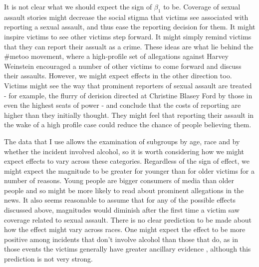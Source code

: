\documentclass[AER,draftmode]{AEA}
\begin{document}
It is not clear what we should expect the sign of $\beta_1$ to be. Coverage of sexual assault stories might decrease the social stigma that victims see associated with reporting a sexual assault, and thus ease the reporting decision for them. It might inspire victims to see other victims step forward. It might simply remind victims that they can report their assualt as a crime. These ideas are what lie behind the \#metoo movement, where a high-profile set of allegations against Harvey Weinstein encouraged a number of other victims to come forward and discuss their assaults. However, we might expect effects in the other direction too. Victims might see the way that prominent reporters of sexual assault are treated - for example, the flurry of derision directed at Christine Blasey Ford by those in even the highest seats of power - and conclude that the costs of reporting are higher than they initially thought. They might feel that reporting their assault in the wake of a high profile case could reduce the chance of people believing them. 

The data that I use allows the examination of subgroups by age, race and by whether the incident involved alcohol, so it is worth considering how we might expect effects to vary across these categories. Regardless of the sign of effect, we might expect the magnitude to be greater for younger than for older victims for a number of reasons. Young people are bigger consumers of media than older people  and so might be more likely to read about prominent allegations in the news. It also seems reasonable to assume that for any of the possible effects discussed above, magnitudes would diminish after the first time a victim saw coverage related to sexual assault.  There is no clear prediction to be made about how the effect might vary across races. One might expect the effect to be more positive among incidents that don't involve alcohol than those that do, as in those events the victims generally have greater ancillary evidence \cite{allen_reporting_2007}, although this prediction is not very strong. 
\end{document}
